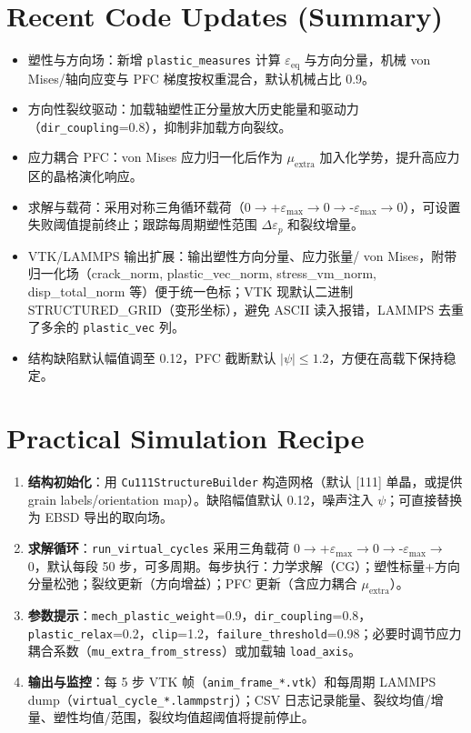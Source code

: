 \documentclass[11pt]{article}
\begin{document}
\section{Recent Code Updates (Summary)}
\begin{itemize}
    \item 塑性与方向场：新增 \texttt{plastic\_measures} 计算 $\varepsilon_{\text{eq}}$ 与方向分量，机械 von Mises/轴向应变与 PFC 梯度按权重混合，默认机械占比 0.9。
    \item 方向性裂纹驱动：加载轴塑性正分量放大历史能量和驱动力（\texttt{dir\_coupling}=0.8），抑制非加载方向裂纹。
    \item 应力耦合 PFC：von Mises 应力归一化后作为 $\mu_\text{extra}$ 加入化学势，提升高应力区的晶格演化响应。
    \item 求解与载荷：采用对称三角循环载荷（0$\rightarrow$+$\varepsilon_{\max}\rightarrow$0$\rightarrow$-$\varepsilon_{\max}\rightarrow$0），可设置失败阈值提前终止；跟踪每周期塑性范围 $\Delta\varepsilon_p$ 和裂纹增量。
    \item VTK/LAMMPS 输出扩展：输出塑性方向分量、应力张量/ von Mises，附带归一化场（crack\_norm, plastic\_vec\_norm, stress\_vm\_norm, disp\_total\_norm 等）便于统一色标；VTK 现默认二进制 STRUCTURED\_GRID（变形坐标），避免 ASCII 读入报错，LAMMPS 去重了多余的 \texttt{plastic\_vec} 列。
    \item 结构缺陷默认幅值调至 0.12，PFC 截断默认 $|\psi|\leq 1.2$，方便在高载下保持稳定。
\end{itemize}

\section{Practical Simulation Recipe}
\begin{enumerate}
    \item \textbf{结构初始化}：用 \texttt{Cu111StructureBuilder} 构造网格（默认 [111] 单晶，或提供 grain labels/orientation map）。缺陷幅值默认 0.12，噪声注入 $\psi$；可直接替换为 EBSD 导出的取向场。
    \item \textbf{求解循环}：\texttt{run\_virtual\_cycles} 采用三角载荷 0$\rightarrow$+$\varepsilon_\text{max}\rightarrow$0$\rightarrow$-$\varepsilon_\text{max}\rightarrow$0，默认每段 50 步，可多周期。每步执行：力学求解（CG）；塑性标量+方向分量松弛；裂纹更新（方向增益）；PFC 更新（含应力耦合 $\mu_{\text{extra}}$）。
    \item \textbf{参数提示}：\texttt{mech\_plastic\_weight}=0.9，\texttt{dir\_coupling}=0.8，\texttt{plastic\_relax}=0.2，\texttt{clip}=1.2，\texttt{failure\_threshold}=0.98；必要时调节应力耦合系数（\texttt{mu\_extra\_from\_stress}）或加载轴 \texttt{load\_axis}。
    \item \textbf{输出与监控}：每 5 步 VTK 帧（\texttt{anim\_frame\_*.vtk}）和每周期 LAMMPS dump（\texttt{virtual\_cycle\_*.lammpstrj}）；CSV 日志记录能量、裂纹均值/增量、塑性均值/范围，裂纹均值超阈值将提前停止。
\end{enumerate}
\end{document}
